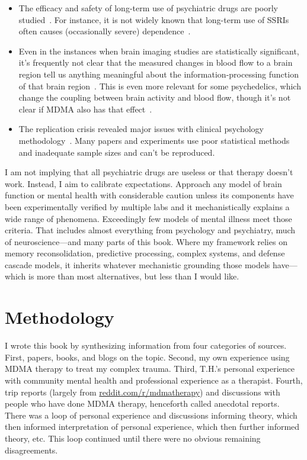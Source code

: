 \documentclass[11pt,oneside]{book}
\let\cite\parencite
\begin{document}
\begin{itemize}
    Imprecise questionnaires, which persist partly because we don't understand the intermediate processes, may measure the wrong thing or miss major relevant effects. The drug may superficially improve some symptoms while creating other, harder-to-see problems.
    \item The efficacy and safety of long-term use of psychiatric drugs are poorly studied~\cite{leuchtDecline}. For instance, it is not widely known that long-term use of SSRIs often causes (occasionally severe) dependence~\cite{crossingZero}.
    \item Even in the instances when brain imaging studies are statistically significant, it's frequently not clear that the measured changes in blood flow to a brain region tell us anything meaningful about the information-processing function of that brain region~\cite{jonas2017microprocessor,dewit2016neuroimaging,alikoEntireBrain}. This is even more relevant for some psychedelics, which change the coupling between brain activity and blood flow, though it's not clear if MDMA also has that effect~\cite{padawerNeurovascularCoupling}.
    \item The replication crisis revealed major issues with clinical psychology methodology~\cite{therapyReplicationCrisis}. Many papers and experiments use poor statistical methods and inadequate sample sizes and can't be reproduced.
\end{itemize}

I am not implying that all psychiatric drugs are useless or that therapy doesn't work. Instead, I aim to calibrate expectations. Approach any model of brain function or mental health with considerable caution unless its components have been experimentally verified by multiple labs and it mechanistically explains a wide range of phenomena. Exceedingly few models of mental illness meet those criteria. That includes almost everything from psychology and psychiatry, much of neuroscience---and many parts of this book. Where my framework relies on memory reconsolidation, predictive processing, complex systems, and defense cascade models, it inherits whatever mechanistic grounding those models have---which is more than most alternatives, but less than I would like.

\section{Methodology}
\label{methodology}
I wrote this book by synthesizing information from four categories of sources. First, papers, books, and blogs on the topic. Second, my own experience using MDMA therapy to treat my complex trauma. Third, T.H.'s personal experience with community mental health and professional experience as a therapist. Fourth, trip reports (largely from \href{https://www.reddit.com/r/mdmatherapy}{reddit.com/r/mdmatherapy}) and discussions with people who have done MDMA therapy, henceforth called anecdotal reports. There was a loop of personal experience and discussions informing theory, which then informed interpretation of personal experience, which then further informed theory, etc. This loop continued until there were no obvious remaining disagreements.
\end{document}

